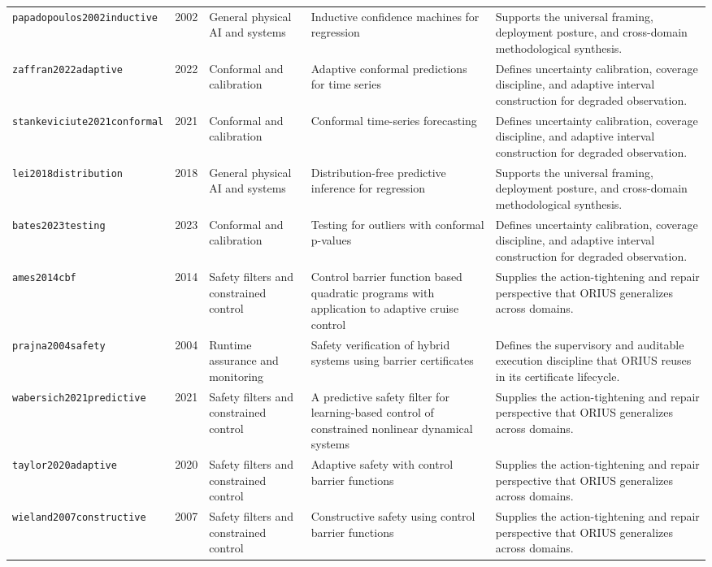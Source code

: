 \begin{longtable}{p{}p{}p{}p{}p{}}
\texttt{papadopoulos2002inductive} & 2002 & General physical AI and systems & Inductive confidence machines for regression & Supports the universal framing, deployment posture, and cross-domain methodological synthesis.\\
\texttt{zaffran2022adaptive} & 2022 & Conformal and calibration & Adaptive conformal predictions for time series & Defines uncertainty calibration, coverage discipline, and adaptive interval construction for degraded observation.\\
\texttt{stankeviciute2021conformal} & 2021 & Conformal and calibration & Conformal time-series forecasting & Defines uncertainty calibration, coverage discipline, and adaptive interval construction for degraded observation.\\
\texttt{lei2018distribution} & 2018 & General physical AI and systems & Distribution-free predictive inference for regression & Supports the universal framing, deployment posture, and cross-domain methodological synthesis.\\
\texttt{bates2023testing} & 2023 & Conformal and calibration & Testing for outliers with conformal p-values & Defines uncertainty calibration, coverage discipline, and adaptive interval construction for degraded observation.\\
\texttt{ames2014cbf} & 2014 & Safety filters and constrained control & Control barrier function based quadratic programs with application to adaptive cruise control & Supplies the action-tightening and repair perspective that ORIUS generalizes across domains.\\
\texttt{prajna2004safety} & 2004 & Runtime assurance and monitoring & Safety verification of hybrid systems using barrier certificates & Defines the supervisory and auditable execution discipline that ORIUS reuses in its certificate lifecycle.\\
\texttt{wabersich2021predictive} & 2021 & Safety filters and constrained control & A predictive safety filter for learning-based control of constrained nonlinear dynamical systems & Supplies the action-tightening and repair perspective that ORIUS generalizes across domains.\\
\texttt{taylor2020adaptive} & 2020 & Safety filters and constrained control & Adaptive safety with control barrier functions & Supplies the action-tightening and repair perspective that ORIUS generalizes across domains.\\
\texttt{wieland2007constructive} & 2007 & Safety filters and constrained control & Constructive safety using control barrier functions & Supplies the action-tightening and repair perspective that ORIUS generalizes across domains.\\

\end{longtable}

